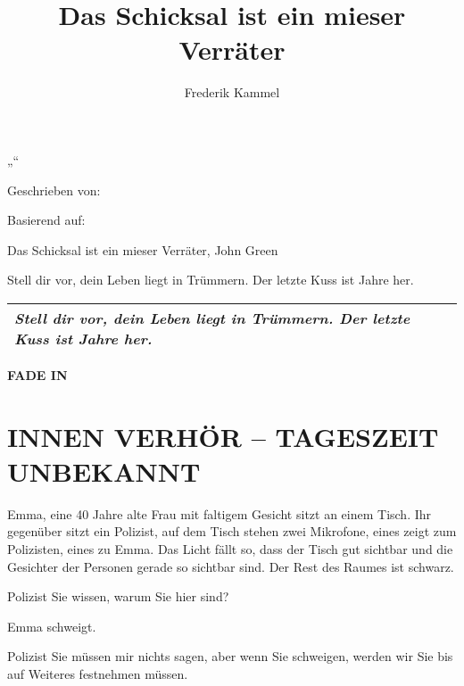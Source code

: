 \documentclass[12pt]{article}
\title{Das Schicksal ist ein mieser Verräter}
\author{Frederik Kammel}
\newenvironment{scene}[4][\unskip]{
    \textbf{\uppercase{#1}}


    \section{\uppercase{#2 #3 -- #4}}\label{sec:scene-#3}
    }{}
\newenvironment{scenedescription}{%
    \begin{flushleft}
    }{
    \end{flushleft}
}
\newcommand{\actionline}[1]{#1}
\newcommand{\BasedOn}{Das Schicksal ist ein mieser Verräter, John Green}
\newcommand{\TitleSlug}{Stell dir vor, dein Leben liegt in Trümmern. \newline Der letzte Kuss ist Jahre her.}
\begin{document}
    \selectfont

    \begin{titlepage}
        \centering
        „\MakeUppercase{\thetitle}“

        \vspace{2cm}
        Geschrieben von:

        \theauthor

        \vspace{2cm}
        Basierend auf:

        \BasedOn

        \ifdefined\TitleSlug
        \vspace{2cm}

        \begin{adjustwidth}{1cm}{1cm}
            \begin{center}
                \begin{tabular}{ P{13cm} }
                    \hline
                    \textit{\TitleSlug} \\
                    \hline
                \end{tabular}
            \end{center}
        \end{adjustwidth}
        \fi
    \end{titlepage}


    \begin{scene}[fade in]{innen}{Verhör}{Tageszeit unbekannt}
        \begin{scenedescription}
            \gls{Emma}, eine 40 Jahre alte Frau mit faltigem Gesicht sitzt an einem Tisch.
            Ihr gegenüber sitzt ein \gls{Polizist}, auf dem Tisch stehen zwei Mikrofone, eines zeigt zum \gls{Polizist}en, eines zu Emma.
            Das Licht fällt so, dass der Tisch gut sichtbar und die Gesichter der Personen gerade so sichtbar sind.
            Der Rest des Raumes ist schwarz.
        \end{scenedescription}

        \begin{dialog}{Polizist}
            Sie wissen, warum Sie hier sind?
        \end{dialog}

        \actionline{\gls{Emma} schweigt.}

        \begin{dialog}[Fortsetzung]{Polizist}
            Sie müssen mir nichts sagen, aber wenn Sie schweigen, werden wir Sie bis auf Weiteres festnehmen müssen.
        \end{dialog}
    \end{scene}
\end{document}
